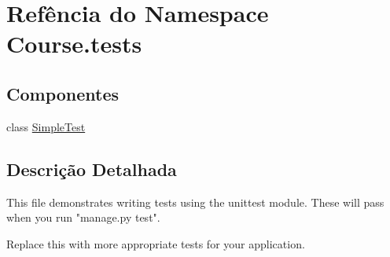 \hypertarget{namespaceCourse_1_1tests}{\section{Refência do Namespace Course.\-tests}
\label{d6/da9/namespaceCourse_1_1tests}
}
\subsection*{Componentes}
\begin{DoxyCompactItemize}
\item 
class \hyperlink{classCourse_1_1tests_1_1SimpleTest}{Simple\-Test}
\end{DoxyCompactItemize}


\subsection{Descrição Detalhada}
\begin{DoxyVerb}This file demonstrates writing tests using the unittest module. These will pass
when you run "manage.py test".

Replace this with more appropriate tests for your application.
\end{DoxyVerb}
 